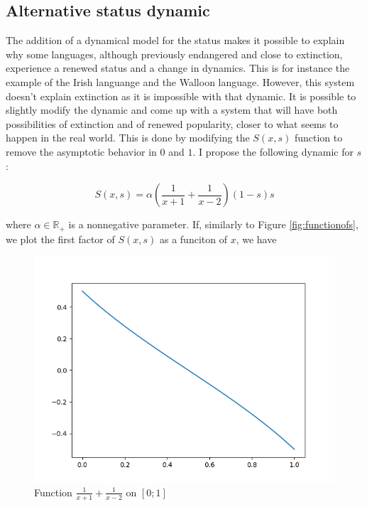 \documentclass{article}
\begin{document}
\subsection*{Alternative status dynamic}
The addition of a dynamical model for the status makes it possible to explain why some languages, although previously endangered and close to extinction, experience a renewed status and a change in dynamics.
This is for instance the example of the Irish languange and the Walloon language.
However, this system doesn't explain extinction as it is impossible with that dynamic.
It is possible to slightly modify the dynamic and come up with a system that will have both possibilities of extinction and of renewed popularity, closer to what seems to happen in the real world.
This is done by modifying the $S(x,s)$ function to remove the asymptotic behavior in $0$ and $1$.
I propose the following dynamic for $s$ :

\begin{equation}
\label{eq:sdyn2}
S(x,s) =  \alpha (\frac{1}{x+1} + \frac{1}{x-2}) (1-s) s
\end{equation}

where $\alpha \in \mathbb{R}_{+}$ is a nonnegative parameter. If, similarly to Figure \ref{fig:functionofs}, we plot the first factor of $S(x,s)$ as a funciton of $x$, we have

\begin{figure}[H]
\centering
\includegraphics[scale=0.5]{functionofs2.png}
\caption{Function $\frac{1}{x+1}+\frac{1}{x-2}$ on $[0;1]$}
\label{fig:functionofs2}
\end{figure}
\end{document}
